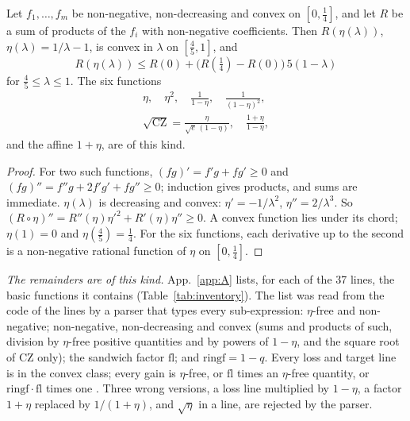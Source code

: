 \begin{lemma} \proofst
\label{lem:chord}
Let $f_1,\dots,f_m$ be non-negative, non-decreasing and convex on $[0,\tfrac14]$, and let $R$ be a sum of products of the $f_i$ with non-negative coefficients.
Then $R(\eta(\lambda))$, $\eta(\lambda)=1/\lambda-1$, is convex in $\lambda$ on $[\tfrac45,1]$, and
\begin{equation}
R(\eta(\lambda))\le R(0)+\bigl(R(\tfrac14)-R(0)\bigr)\,5(1-\lambda)
\label{eq:chord}
\end{equation}
for $\tfrac45\le\lambda\le1$.
The six functions
\begin{gather}
\eta,\quad \eta^2,\quad \frac1{1-\eta},\quad \frac1{(1-\eta)^2},\\ \sqrt{\mathrm{CZ}}=\frac{\eta}{\sqrt e\,(1-\eta)},\quad \frac{1+\eta}{1-\eta},
\end{gather}
and the affine $1+\eta$, are of this kind.
\end{lemma}

\begin{proof}
For two such functions, $(fg)'=f'g+fg'\ge0$ and $(fg)''=f''g+2f'g'+fg''\ge0$; induction gives products, and sums are immediate.
$\eta(\lambda)$ is decreasing and convex: $\eta'=-1/\lambda^2$, $\eta''=2/\lambda^3$.
So $(R\circ\eta)''=R''(\eta)\eta'^2+R'(\eta)\eta''\ge0$.
A convex function lies under its chord; $\eta(1)=0$ and $\eta(\tfrac45)=\tfrac14$.
For the six functions, each derivative up to the second is a non-negative rational function of $\eta$ on $[0,\tfrac14]$.
\end{proof}

\emph{The remainders are of this kind.}
App.~\ref{app:A} lists, for each of the 37 lines, the basic functions it contains (Table~\ref{tab:inventory}).
The list was read from the code of the lines by a parser that types every sub-expression: $\eta$-free and non-negative; non-negative, non-decreasing and convex (sums and products of such, division by $\eta$-free positive quantities and by powers of $1-\eta$, and the square root of CZ only); the sandwich factor $\mathrm{fl}$; and $\mathrm{ringf}=1-q$.
Every loss and target line is in the convex class; every gain is $\eta$-free, or $\mathrm{fl}$ times an $\eta$-free quantity, or $\mathrm{ringf}\cdot\mathrm{fl}$ times one .
Three wrong versions, a loss line multiplied by $1-\eta$, a factor $1+\eta$ replaced by $1/(1+\eta)$, and $\sqrt\eta$ in a line, are rejected by the parser.

